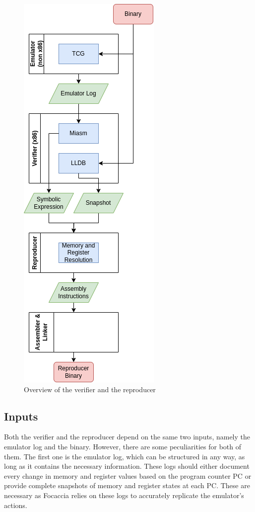 \begin{figure}[ht]
   \centering
   \includegraphics[width=0.45\linewidth]{figures/ver_and_rep_1}
   \caption[Verifier and reproducer]{Overview of the verifier and the reproducer}
   \label{fig:ver_and_rep_1}
\end{figure}

\subsection{Inputs}
Both the verifier and the reproducer depend on the same two inputs, namely the emulator log and the binary.
However, there are some peculiarities for both of them.
The first one is the emulator log, which can be structured in any way, as long as it contains the necessary information.
These logs should either document every change in memory and register values based on the program counter \ac{PC} or provide complete snapshots of memory and register states at each PC.
These are necessary as Focaccia relies on these logs to accurately replicate the emulator's actions.

